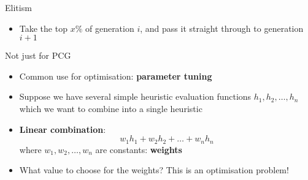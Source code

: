 \begin{frame}{Elitism}
	\begin{itemize}
		\pause\item Take the top $x\%$ of generation $i$, and pass it straight through to generation $i+1$
	\end{itemize}
\end{frame}

\begin{frame}{Not just for PCG}
	\begin{itemize}
		\pause\item Common use for optimisation: \textbf{parameter tuning}
		\pause\item Suppose we have several simple heuristic evaluation functions $h_1, h_2, \dots, h_n$
			which we want to combine into a single heuristic
		\pause\item \textbf{Linear combination}:
			$$ w_1 h_1 + w_2 h_2 + \dots + w_n h_n $$
			where $w_1, w_2, \dots, w_n$ are constants: \textbf{weights}
		\pause\item What value to choose for the weights? This is an optimisation problem!
	\end{itemize}
\end{frame}
